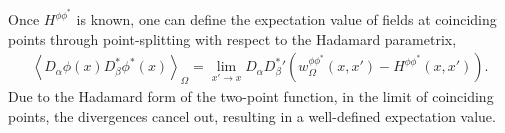 Once $H^{\phi \phi^*}$ is known, one can define the expectation value of fields at coinciding points through point-splitting with respect to the Hadamard parametrix, 
\begin{align}
	\left<D_\alpha \phi(x)D^*_\beta \phi^*(x) \right>_\Omega = \lim_{x' \to x} D_\alpha D_\beta^* ' \left( w^{\phi\phi^*}_\Omega(x, x') - H^{\phi \phi^*}(x, x') \right) .
	\label{eq:point-splitting-wrt-a-Hadamard-parametrix}
\end{align}
Due to the Hadamard form of the two-point function, in the limit of coinciding points, the divergences cancel out, resulting in a well-defined expectation value.
%
%
%
%
%
% 
%
